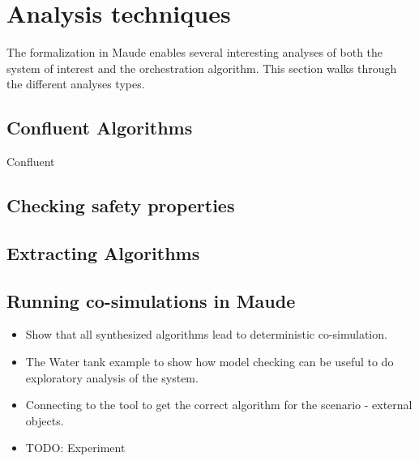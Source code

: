 \section{Analysis techniques}\label{sc:casestudy}

The formalization in Maude enables several interesting analyses of both the system of interest and the orchestration algorithm. 
This section walks through the different analyses types.

\subsection{Confluent Algorithms}
Confluent 


\subsection{Checking safety properties}


\subsection{Extracting Algorithms}

\subsection{Running co-simulations in Maude}

\begin{itemize}
  \item Show that all synthesized algorithms lead to deterministic co-simulation.
  \item The Water tank example to show how model checking can be useful to do exploratory analysis of the system.
  \item Connecting to the tool to get the correct algorithm for the scenario - external objects.
  \item TODO: Experiment
\end{itemize}
